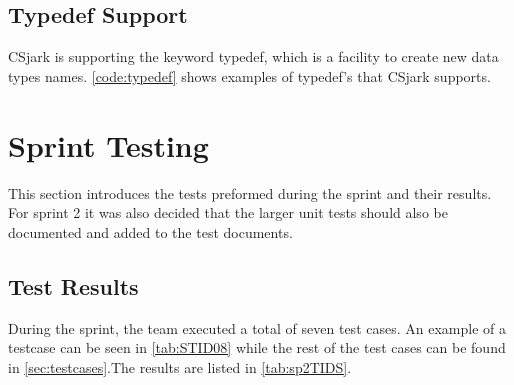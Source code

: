 

\subsection{Typedef Support}
CSjark is supporting the keyword typedef, which is a facility to create new 
data types names. \autoref{code:typedef} shows examples of typedef's that 
CSjark supports.



\section{Sprint Testing}
\label{sec:sp2:test}
This section introduces the tests preformed during the sprint and their results. For sprint 2 it was also decided that the larger unit tests should also be documented and added to the test documents.

\subsection{Test Results}
During the sprint, the team executed a total of seven test cases. An example of a testcase can be seen in \autoref{tab:STID08} while the rest of the  test cases can be found in \autoref{sec:testcases}.The results are listed in \autoref{tab:sp2TIDS}.


